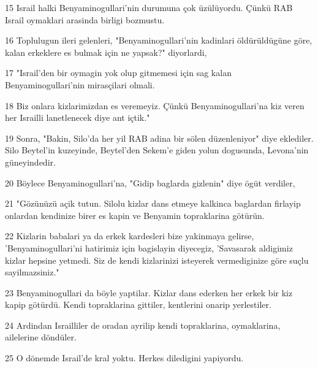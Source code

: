 \par 15 Israil halki Benyaminogullari'nin durumuna çok üzülüyordu. Çünkü RAB Israil oymaklari arasinda birligi bozmustu.
\par 16 Toplulugun ileri gelenleri, "Benyaminogullari'nin kadinlari öldürüldügüne göre, kalan erkeklere es bulmak için ne yapsak?" diyorlardi,
\par 17 "Israil'den bir oymagin yok olup gitmemesi için sag kalan Benyaminogullari'nin mirasçilari olmali.
\par 18 Biz onlara kizlarimizdan es veremeyiz. Çünkü Benyaminogullari'na kiz veren her Israilli lanetlenecek diye ant içtik."
\par 19 Sonra, "Bakin, Silo'da her yil RAB adina bir sölen düzenleniyor" diye eklediler. Silo Beytel'in kuzeyinde, Beytel'den Sekem'e giden yolun dogusunda, Levona'nin güneyindedir.
\par 20 Böylece Benyaminogullari'na, "Gidip baglarda gizlenin" diye ögüt verdiler,
\par 21 "Gözünüzü açik tutun. Silolu kizlar dans etmeye kalkinca baglardan firlayip onlardan kendinize birer es kapin ve Benyamin topraklarina götürün.
\par 22 Kizlarin babalari ya da erkek kardesleri bize yakinmaya gelirse, 'Benyaminogullari'ni hatirimiz için bagislayin diyecegiz, 'Savasarak aldigimiz kizlar hepsine yetmedi. Siz de kendi kizlarinizi isteyerek vermediginize göre suçlu sayilmazsiniz."
\par 23 Benyaminogullari da böyle yaptilar. Kizlar dans ederken her erkek bir kiz kapip götürdü. Kendi topraklarina gittiler, kentlerini onarip yerlestiler.
\par 24 Ardindan Israilliler de oradan ayrilip kendi topraklarina, oymaklarina, ailelerine döndüler.
\par 25 O dönemde Israil'de kral yoktu. Herkes diledigini yapiyordu.


